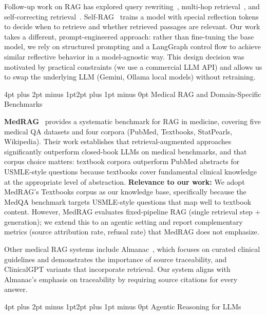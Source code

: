 \documentclass[10pt,twocolumn,letterpaper]{article}
\makeatletter
\renewcommand\subsection{\@startsection{subsection}{2}{\z@}%
  {4pt plus 2pt minus 1pt}{2pt plus 1pt minus 0pt}%
  {\normalsize\bfseries}}
\makeatother
\begin{document}
Follow-up work on RAG has explored query rewriting~\cite{ma2023query}, multi-hop retrieval~\cite{trivedi2023interleaving}, and self-correcting retrieval~\cite{asai2024selfrag}. Self-RAG~\cite{asai2024selfrag} trains a model with special reflection tokens to decide when to retrieve and whether retrieved passages are relevant. Our work takes a different, prompt-engineered approach: rather than fine-tuning the base model, we rely on structured prompting and a LangGraph control flow to achieve similar reflective behavior in a model-agnostic way. This design decision was motivated by practical constraints (we use a commercial LLM API) and allows us to swap the underlying LLM (Gemini, Ollama local models) without retraining.

\subsection{Medical RAG and Domain-Specific Benchmarks}

\textbf{MedRAG}~\cite{xiong2024benchmarking} provides a systematic benchmark for RAG in medicine, covering five medical QA datasets and four corpora (PubMed, Textbooks, StatPearls, Wikipedia). Their work establishes that retrieval-augmented approaches significantly outperform closed-book LLMs on medical benchmarks, and that corpus choice matters: textbook corpora outperform PubMed abstracts for USMLE-style questions because textbooks cover fundamental clinical knowledge at the appropriate level of abstraction.
\textbf{Relevance to our work:} We adopt MedRAG's Textbooks corpus as our knowledge base, specifically because the MedQA benchmark targets USMLE-style questions that map well to textbook content. However, MedRAG evaluates fixed-pipeline RAG (single retrieval step + generation); we extend this to an agentic setting and report complementary metrics (source attribution rate, refusal rate) that MedRAG does not emphasize.

Other medical RAG systems include Almanac~\cite{zakka2024almanac}, which focuses on curated clinical guidelines and demonstrates the importance of source traceability, and ClinicalGPT variants that incorporate retrieval. Our system aligns with Almanac's emphasis on traceability by requiring source citations for every answer.

\subsection{Agentic Reasoning for LLMs}
\end{document}

